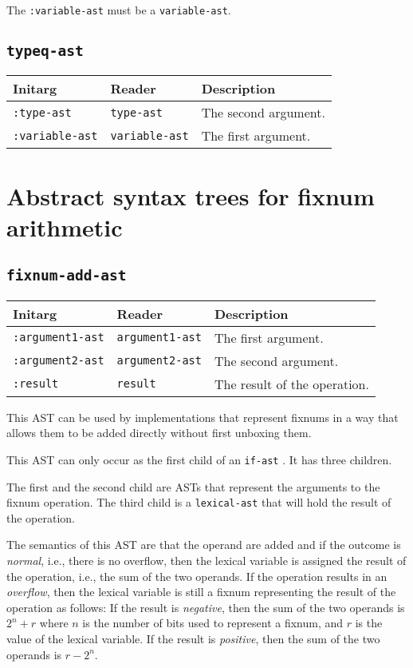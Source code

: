 The \texttt{:variable-ast} must be a \texttt{variable-ast}.

\subsection{\texttt{typeq-ast}}
\label{typeq-ast}

\begin{tabular}{|l|l|l|}
\hline
Initarg & Reader & Description\\
\hline\hline
\texttt{:type-ast} & \texttt{type-ast} & The second argument.\\
\hline
\texttt{:variable-ast} & \texttt{variable-ast} & The first argument.\\
\hline
\end{tabular}

\section{Abstract syntax trees for fixnum arithmetic}

\subsection{\texttt{fixnum-add-ast}}
\label{fixnum-add-ast}

\begin{tabular}{|l|l|l|}
\hline
Initarg & Reader & Description\\
\hline\hline
\texttt{:argument1-ast} & \texttt{argument1-ast} & The first argument.\\
\hline
\texttt{:argument2-ast} & \texttt{argument2-ast} & The second argument.\\
\hline
\texttt{:result} & \texttt{result} & The result of the operation.\\
\hline
\end{tabular}

This AST can be used by implementations that represent fixnums in a
way that allows them to be added directly without first unboxing
them.  

This AST can only occur as the first child of an \texttt{if-ast}
.  It has three children.

The first and the second child are ASTs that represent the arguments
to the fixnum operation.  The third child is a
\texttt{lexical-ast} that will hold the result of the operation.

The semantics of this AST are that the operand are added and if the
outcome is \emph{normal}, i.e., there is no overflow, then the lexical
variable is assigned the result of the operation, i.e., the sum of the
two operands.  If the operation results in an \emph{overflow}, then
the lexical variable is still a fixnum representing the result of the
operation as follows:  If the result is \emph{negative}, then the
sum of the two operands is $2^n + r$ where $n$ is the number of bits
used to represent a fixnum, and $r$ is the value of the lexical
variable.  If the result is \emph{positive}, then the sum of the two
operands is $r - 2^n$.

